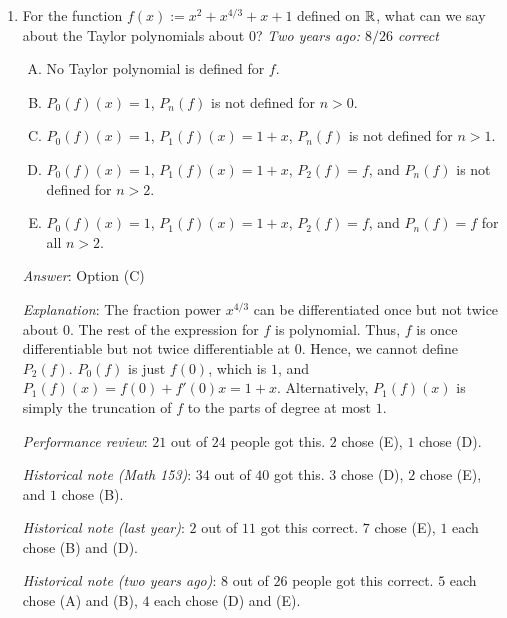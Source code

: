 \documentclass[10pt]{amsart}
\begin{document}
\begin{enumerate}
  {\em Historical note (two years ago)}: $11$ out of $26$ people
  got this correct. $7$ chose (A), $3$ each chose (B) and (E), $1$
  chose (D), and $1$ left the question blank.

\item For the function $f(x) := x^2 + x^{4/3} + x + 1$ defined on
  $\mathbb{R}$, what can we say about the Taylor polynomials about $0$? {\em
  Two years ago: $8/26$ correct}

  \begin{enumerate}[(A)]
  \item No Taylor polynomial is defined for $f$.
  \item $P_0(f)(x) = 1$, $P_n(f)$ is not defined for $n > 0$.
  \item $P_0(f)(x) = 1$, $P_1(f)(x) = 1 + x$, $P_n(f)$ is not defined
    for $n > 1$.
  \item $P_0(f)(x) = 1$, $P_1(f)(x) = 1 + x$, $P_2(f) = f$, and
    $P_n(f)$ is not defined for $n > 2$.
  \item $P_0(f)(x) = 1$, $P_1(f)(x) = 1 + x$, $P_2(f) = f$, and
    $P_n(f) = f$ for all $n > 2$.
  \end{enumerate}

  {\em Answer}: Option (C)

  {\em Explanation}: The fraction power $x^{4/3}$ can be
  differentiated once but not twice about $0$. The rest of the
  expression for $f$ is polynomial. Thus, $f$ is once differentiable
  but not twice differentiable at $0$. Hence, we cannot define
  $P_2(f)$. $P_0(f)$ is just $f(0)$, which is $1$, and $P_1(f)(x) =
  f(0) + f'(0)x = 1 + x$. Alternatively, $P_1(f)(x)$ is simply the
  truncation of $f$ to the parts of degree at most $1$.

  {\em Performance review}: $21$ out of $24$ people got this. $2$
  chose (E), $1$ chose (D).

  {\em Historical note (Math 153)}: $34$ out of $40$ got this. $3$ chose (D),
  $2$ chose (E), and $1$ chose (B).

  {\em Historical note (last year)}: $2$ out of $11$ got this correct. $7$
  chose (E), $1$ each chose (B) and (D).

  {\em Historical note (two years ago)}: $8$ out of $26$ people got this
  correct. $5$ each chose (A) and (B), $4$ each chose (D) and (E).


\end{enumerate}
\end{document}
